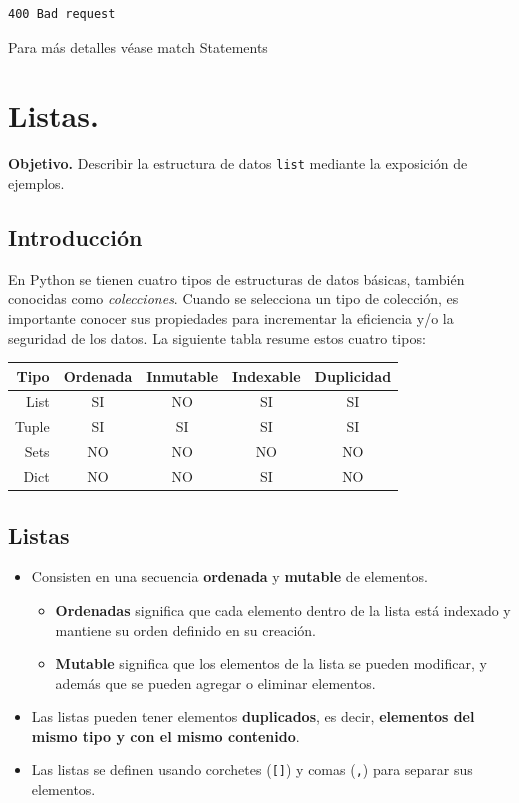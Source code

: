 \documentclass[
  spanish,
  letterpaper,
]{scrbook}
\providecommand{\tightlist}{%
  \setlength{\itemsep}{0pt}\setlength{\parskip}{0pt}}
\theoremstyle{definition}
\theoremstyle{remark}
\begin{document}
\begin{verbatim}
400 Bad request
\end{verbatim}

Para más detalles véase match Statements

\chapter{Listas.}\label{sec-i-listas}

\textbf{Objetivo.} Describir la estructura de datos \texttt{list}
mediante la exposición de ejemplos.

\section{Introducción}\label{introducciuxf3n-1}

En Python se tienen cuatro tipos de estructuras de datos básicas,
también conocidas como \emph{colecciones}. Cuando se selecciona un tipo
de colección, es importante conocer sus propiedades para incrementar la
eficiencia y/o la seguridad de los datos. La siguiente tabla resume
estos cuatro tipos:

\begin{longtable}[]{@{}rcccc@{}}
\toprule\noalign{}
Tipo & Ordenada & Inmutable & Indexable & Duplicidad \\
\midrule\noalign{}
\endhead
\bottomrule\noalign{}
\endlastfoot
List & SI & NO & SI & SI \\
Tuple & SI & SI & SI & SI \\
Sets & NO & NO & NO & NO \\
Dict & NO & NO & SI & NO \\
\end{longtable}

\section{Listas}\label{listas}

\begin{itemize}
\tightlist
\item
  Consisten en una secuencia \textbf{ordenada} y \textbf{mutable} de
  elementos.

  \begin{itemize}
  \tightlist
  \item
    \textbf{Ordenadas} significa que cada elemento dentro de la lista
    está indexado y mantiene su orden definido en su creación.
  \item
    \textbf{Mutable} significa que los elementos de la lista se pueden
    modificar, y además que se pueden agregar o eliminar elementos.
  \end{itemize}
\item
  Las listas pueden tener elementos \textbf{duplicados}, es decir,
  \textbf{elementos del mismo tipo y con el mismo contenido}.
\item
  Las listas se definen usando corchetes (\texttt{{[}{]}}) y comas
  (\texttt{,}) para separar sus elementos.
\end{itemize}
\end{document}
